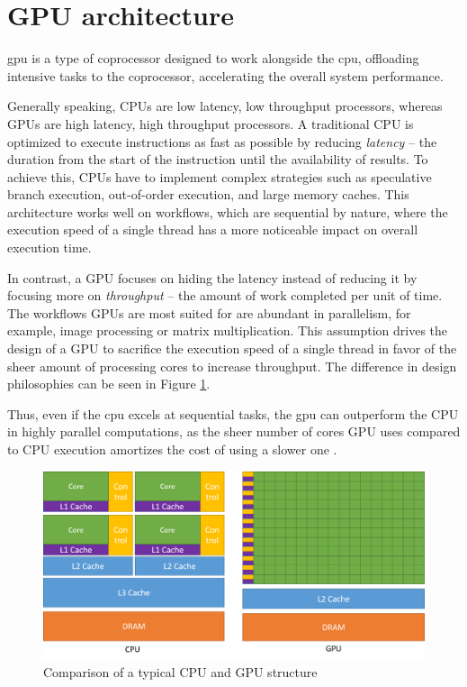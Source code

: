 \section {GPU architecture}

\acrfull{gpu} is a type of coprocessor designed to work alongside the \acrshort{cpu}, offloading intensive tasks to the coprocessor, accelerating the overall system performance.

Generally speaking, CPUs are low latency, low throughput processors, whereas GPUs are high latency, high throughput processors. A traditional CPU is optimized to execute instructions as fast as possible by reducing \textit{latency} -- the duration from the start of the instruction until the availability of results. To achieve this, CPUs have to implement complex strategies such as speculative branch execution, out-of-order execution, and large memory caches. This architecture works well on workflows, which are sequential by nature, where the execution speed of a single thread has a more noticeable impact on overall execution time.

In contrast, a GPU focuses on hiding the latency instead of reducing it by focusing more on \textit{throughput} -- the amount of work completed per unit of time. The workflows GPUs are most suited for are abundant in parallelism, for example, image processing or matrix multiplication. This assumption drives the design of a GPU to sacrifice the execution speed of a single thread in favor of the sheer amount of processing cores to increase throughput. The difference in design philosophies can be seen in Figure \ref{figure:cpu-vs-gpu}.

Thus, even if the \acrshort{cpu} excels at sequential tasks, the \acrshort{gpu} can outperform the CPU in highly parallel computations, as the sheer number of cores GPU uses compared to CPU execution amortizes the cost of using a slower one \cite{cudaprog}.

\begin{figure}
  \centering
  \includegraphics[width=\textwidth]{components/figure/cpu-vs-gpu.png}
  \caption{Comparison of a typical CPU and GPU structure \cite{cudaprog}}
  \label{figure:cpu-vs-gpu}
\end{figure}

